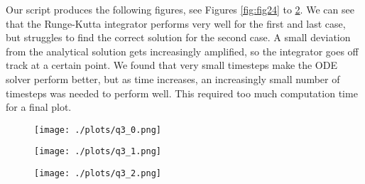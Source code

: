 

% 

Our script produces the following figures, see Figures \ref{fig:fig24} to  \ref{fig:fig26}. We can see that the Runge-Kutta integrator performs very well for the first and last case, but struggles to find the correct solution for the second case. A small deviation from the analytical solution gets increasingly amplified, so the integrator goes off track at a certain point. We found that very small timesteps make the ODE solver perform better, but as time increases, an increasingly small number of timesteps was needed to perform well. This required too much computation time for a final plot.

\begin{figure}[ht]\centering
\begin{minipage}[t]{.5\textwidth}
\centering
\texttt{[image: ./plots/q3\_0.png]}
\captionsetup{width=0.8\linewidth}
\label{fig:fig24}
\end{minipage}%
\begin{minipage}[t]{.5\textwidth}
\centering
\texttt{[image: ./plots/q3\_1.png]}
\captionsetup{width=0.8\linewidth}
\label{fig:fig25}
\end{minipage}%
\end{figure}

\begin{figure}[ht]\centering
\begin{minipage}[t]{.5\textwidth}
\centering
\texttt{[image: ./plots/q3\_2.png]}
\captionsetup{width=0.8\linewidth}
\label{fig:fig26}
\end{minipage}%
\begin{minipage}[t]{.5\textwidth}
\centering
\end{minipage}%
\end{figure}
